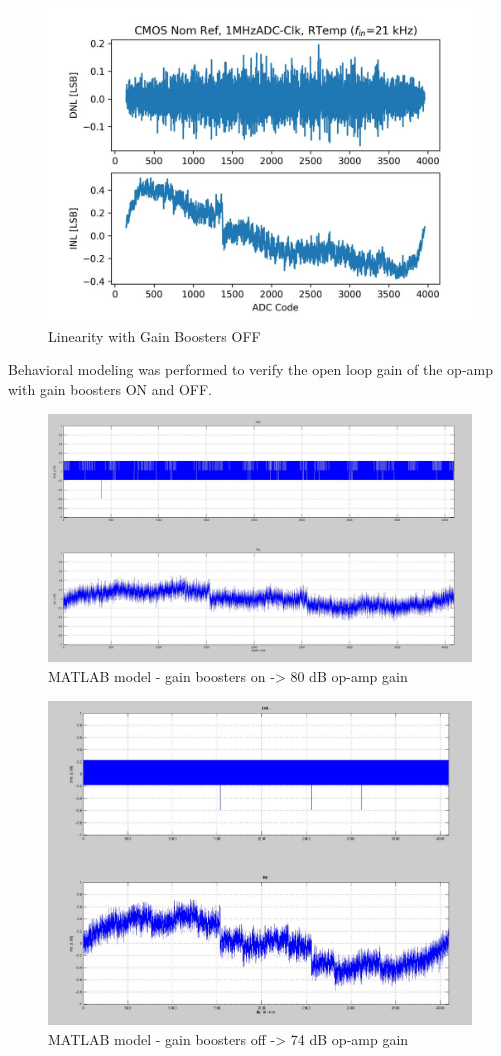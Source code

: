 \begin{figure}[h!]
\centering
  \includegraphics[width=0.6\linewidth]{figures/prakash_fig/linearity_GB_OFF.JPG}
  \caption{Linearity with Gain Boosters OFF}
  \label{fig:linearity_GB_OFF}
\end{figure}

Behavioral modeling was performed to verify the open loop gain of the op-amp with gain boosters ON and OFF. 

\begin{figure}[h!]
\centering
  \includegraphics[width=0.6\linewidth]{figures/prakash_fig/behav_GB_ON.JPG}
  \caption{MATLAB model - gain boosters on -> 80 dB op-amp gain}
  \label{fig:behav_GB_ON}
\end{figure}

\begin{figure}[h!]
\centering
  \includegraphics[width=0.6\linewidth]{figures/prakash_fig/behav_GB_OFF.JPG}
  \caption{MATLAB model - gain boosters off -> 74 dB op-amp gain}
  \label{fig:behav_GB_OFF}
\end{figure}

